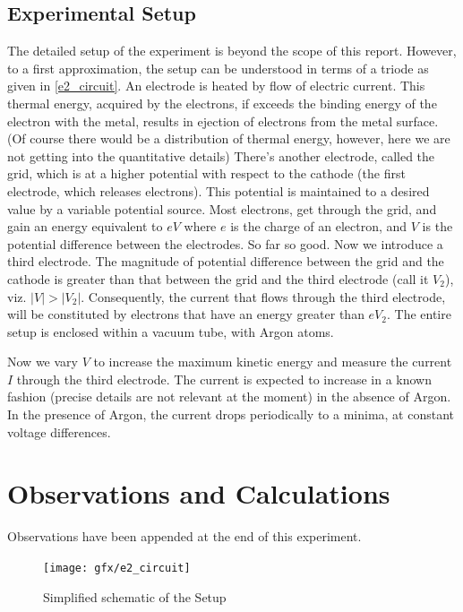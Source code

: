 	\subsection{Experimental Setup}	
		The detailed setup of the experiment is beyond the scope of this report. However, to a first approximation, the setup can be understood in terms of a triode as given in \autoref{e2_circuit}. An electrode is heated by flow of electric current. This thermal energy, acquired by the electrons, if exceeds the binding energy of the electron with the metal, results in ejection of electrons from the metal surface. (Of course there would be a distribution of thermal energy, however, here we are not getting into the quantitative details) There's another electrode, called the grid, which is at a higher potential with respect to the cathode (the first electrode, which releases electrons). This potential is maintained to a desired value by a variable potential source. Most electrons, get through the grid, and gain an energy equivalent to $eV$ where $e$ is the charge of an electron, and $V$ is the potential difference between the electrodes. So far so good. Now we introduce a third electrode. The magnitude of potential difference between the grid and the cathode is greater than that between the grid and the third electrode (call it $V_2$), viz. $|V|>|V_2|$. Consequently, the current that flows through the third electrode, will be constituted by electrons that have an energy greater than $eV_2$. The entire setup is enclosed within a vacuum tube, with Argon atoms.
		\par
		Now we vary $V$ to increase the maximum kinetic energy and measure the current $I$ through the third electrode. The current is expected to increase in a known fashion (precise details are not relevant at the moment) in the absence of Argon. In the presence of Argon, the current drops periodically to a minima, at constant voltage differences.
\section{Observations and Calculations}
	Observations have been appended at the end of this experiment. \\

	\begin{figure}[bth]
		\begin{center}
			\texttt{[image: gfx/e2\_circuit]}
		\end{center}
	\caption[Simplified schematic of the Setup]{Simplified schematic of the Setup}
	\label{e2_circuit}
	\end{figure}


